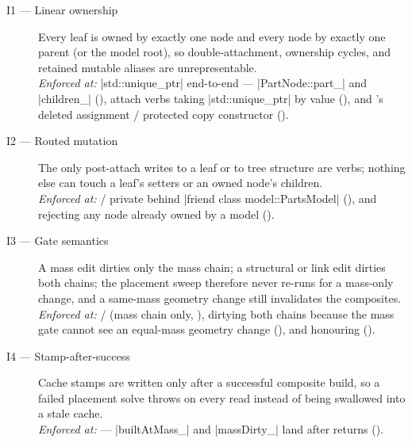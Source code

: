 \begin{description}

\item[I1 --- Linear ownership] Every leaf is owned by exactly one node and every node by
  exactly one parent (or the model root), so double-attachment, ownership cycles, and
  retained mutable aliases are unrepresentable.\\
  \emph{Enforced at:} \cppinline|std::unique_ptr| end-to-end ---
  \cppinline|PartNode::part_| and \cppinline|children_|
  (), attach verbs taking
  \cppinline|std::unique_ptr| by value (), and
  's deleted assignment / protected copy constructor
  ().

\item[I2 --- Routed mutation] The only post-attach writes to a leaf or to tree structure
  are  verbs; nothing else can touch a leaf's setters or an owned
  node's children.\\
  \emph{Enforced at:} / private behind
  \cppinline|friend class model::PartsModel| (), and
   rejecting any node already owned by a model
  ().

\item[I3 --- Gate semantics] A mass edit dirties only the mass chain; a structural or
  link edit dirties both chains; the placement sweep therefore never re-runs for a
  mass-only change, and a same-mass geometry change still invalidates the composites.\\
  \emph{Enforced at:} / (mass chain only,
  ),  dirtying both chains because
  the mass gate cannot see an equal-mass geometry change
  (), and  honouring
   ().

\item[I4 --- Stamp-after-success] Cache stamps are written only after a successful
  composite build, so a failed placement solve throws on every read instead of being
  swallowed into a stale cache.\\
  \emph{Enforced at:}  --- \cppinline|builtAtMass_|
  and \cppinline|massDirty_| land after  returns
  ().


\end{description}
